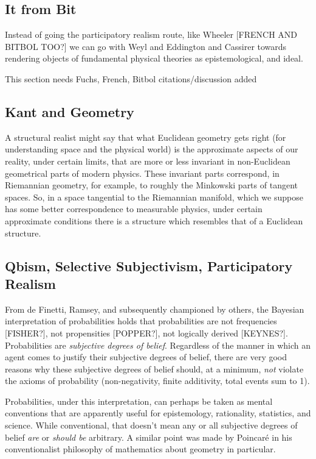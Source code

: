 \subsection{It from Bit}

Instead of going the participatory realism route, like Wheeler [FRENCH AND BITBOL TOO?] we can go with Weyl and Eddington and Cassirer towards rendering objects of fundamental physical theories as epistemological, and ideal.

This section needs Fuchs, French, Bitbol citations/discussion added

\subsection{Kant and Geometry}

A structural realist might say that what Euclidean geometry gets right (for understanding space and the physical world) is the approximate aspects of our reality, under certain limits, that are more or less invariant in non-Euclidean geometrical parts of modern physics.  These invariant parts correspond, in Riemannian geometry, for example, to roughly the Minkowski parts of tangent spaces.  So, in a space tangential to the Riemannian manifold, which we suppose has some better correspondence to measurable physics, under certain approximate conditions there is a structure which resembles that of a Euclidean structure.







\subsection{Qbism, Selective Subjectivism, Participatory Realism}

From de Finetti, Ramsey, and subsequently championed by others, the Bayesian interpretation of probabilities holds that probabilities are not frequencies [FISHER?], not propensities [POPPER?], not logically derived [KEYNES?].  Probabilities are \emph{subjective degrees of belief}. Regardless of the manner in which an agent comes to justify their subjective degrees of belief, there are very good reasons why these subjective degrees of belief should, at a minimum, \emph{not} violate the axioms of probability (non-negativity, finite additivity, total events sum to 1).

Probabilities, under this interpretation, can perhaps be taken as mental conventions that are apparently useful for epistemology, rationality, statistics, and science.  While conventional, that doesn't mean any or all subjective degrees of belief \emph{are} or \emph{should be} arbitrary.  A similar point was made by Poincar\'e in his conventionalist philosophy of mathematics about geometry in particular.  

